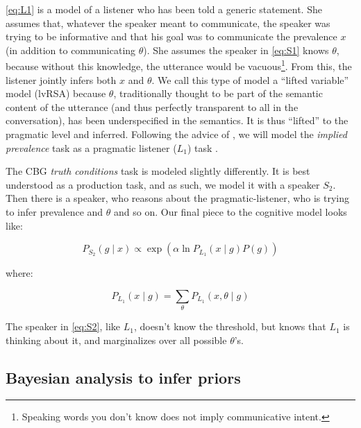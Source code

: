 \documentclass[10pt,letterpaper]{article}
\begin{document}
\eqref{eq:L1} is a model of a listener who has been told a generic statement. She assumes that, whatever the speaker meant to communicate, the speaker was trying to be informative and that his goal was to communicate the prevalence $x$ (in addition to communicating $\theta$). She assumes the speaker in \eqref{eq:S1} knows $\theta$, because without this knowledge, the utterance would be vacuous\footnote{Speaking words you don't know does not imply communicative intent.}.  From this, the listener jointly infers both $x$ and $\theta$. We call this type of model a ``lifted variable'' model (lvRSA) because $\theta$, traditionally thought to be part of the semantic content of the utterance (and thus perfectly transparent to all in the conversation), has been underspecified in the semantics. It is thus ``lifted'' to the pragmatic level and inferred. Following the advice of , we will model the \emph{implied prevalence} task as a pragmatic listener ($L_{1}$) task .  

The CBG \emph{truth conditions} task is modeled slightly differently. It is best understood as a production task, and as such, we model it with a speaker $S_{2}$. Then there is a speaker, who reasons about the pragmatic-listener, who is trying to infer prevalence and $\theta$ and so on. Our final piece to the cognitive model looks like:

\begin{equation} 
P_{S_{2}}(g \mid x) \propto \exp{(\alpha \ln{P_{L_{1}}(x \mid g) P(g)})}
\label{eq:S2}
\end{equation}

where: 

$$ P_{L_{1}}(x \mid g) = \sum_{\theta} P_{L_{1}}(x , \theta \mid g) $$

%			
%			

The speaker in \eqref{eq:S2}, like $L_{1}$, doesn't know the threshold, but knows that $L_{1}$ is thinking about it, and marginalizes over all possible $\theta$'s.

\subsection{Bayesian analysis to infer priors}
\end{document}
